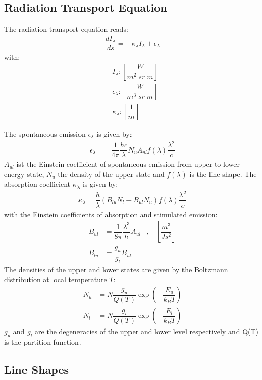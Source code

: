 \subsection{Radiation Transport Equation}

The radiation transport equation reads:
\begin{align}
	\label{eqn1}
	\dfrac{d I_{\lambda}}{ds} = - \kappa_\lambda I_{\lambda} + 	\epsilon_\lambda
\end{align}
with:
\begin{align*}
	&I_{\lambda}    : \left[\dfrac{W}{m^2 \; sr \; m}\right] \\
	&\epsilon_{\lambda} : \left[\dfrac{W}{m^3 \; sr \; m}\right] \\
	&\kappa_{\lambda}   : \left[\dfrac{1}{m}\right]
\end{align*}

The spontaneous emission $\epsilon_\lambda$ is given by:
\begin{align}
	\epsilon_\lambda &= \dfrac{1}{4 \pi} \dfrac{h c}{\lambda} N_u A_{ul} f(\lambda)
	 \dfrac{\lambda^2}{c}
\end{align}
$A_{ul}$ ist the Einstein coefficient of spontaneous emission from upper to lower energy state, $N_u$ the density of the upper state and $f(\lambda)$ is the line shape. The absorption coefficient $\kappa_\lambda$ is given by:
\begin{align}
	\kappa_\lambda  = \dfrac{h}{\lambda}  \left(  B_{lu} N_l -  B_{ul} N_u \right) f(\lambda)
	 \dfrac{\lambda^2}{c}
\end{align}
with the Einstein coefficients of absorption and stimulated emission:
\begin{align}
	B_{ul} &= \dfrac{1}{8 \pi} \dfrac{\lambda^3}{h} A_{ul} \;\;\; , \;\;\; \left[\dfrac{m^3}{J s^2}\right] \\
	B_{lu} &= \dfrac{g_u}{g_l} B_{ul}
\end{align}
The densities of the upper and lower states are given by the Boltzmann distribution at local temperature $T$:
\begin{align}
	N_u &= N \dfrac{g_u}{Q(T)} \exp\left(- \dfrac{E_u}{k_B T} \right) \\
	N_l &= N \dfrac{g_l}{Q(T)} \exp\left(- \dfrac{E_l}{k_B T} \right)
\end{align}
$g_u$ and $g_l$ are the degeneracies of the upper and lower level respectively and Q(T) is the partition function.


\subsection{Line Shapes}

